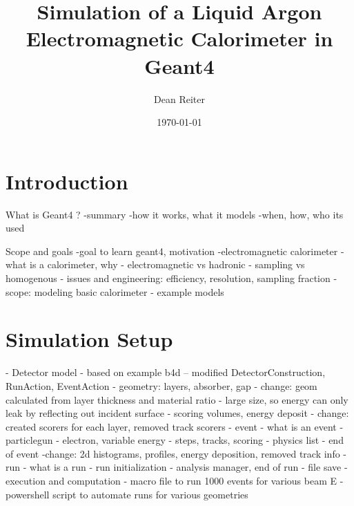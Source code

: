 \documentclass[%
 reprint,
 amsmath,amssymb,
 aps,
]{revtex4-2}
\begin{document}

\title{Simulation of a Liquid Argon Electromagnetic Calorimeter in Geant4}%

\author{Dean Reiter}
%

\date{\today}%

\begin{abstract}


\end{abstract}


\maketitle



\section{Introduction}

What is Geant4 ?
-summary
-how it works, what it models
-when, how, who its used

Scope and goals
-goal to learn geant4, motivation
-electromagnetic calorimeter 
    - what is a calorimeter, why
    - electromagnetic vs hadronic
    - sampling vs homogenous
    - issues and engineering: efficiency, resolution, sampling fraction
-scope: modeling basic calorimeter
    - example models

\section{Simulation Setup}

- Detector model
    - based on example b4d -- modified DetectorConstruction, RunAction, EventAction
    - geometry: layers, absorber, gap
        - change: geom calculated from layer thickness and material ratio
        - large size, so energy can only leak by reflecting out incident surface
    - scoring volumes, energy deposit
        - change: created scorers for each layer, removed track scorers
- event 
    - what is an event
    - particlegun - electron, variable energy
    - steps, tracks, scoring
    - physics list
    - end of event
        -change: 2d histograms, profiles, energy deposition, removed track info
- run 
    - what is a run
    - run initialization
    - analysis manager, end of run
        - file save
- execution and computation
    - macro file to run 1000 events for various beam E
    - powershell script to automate runs for various geometries
\end{document}
